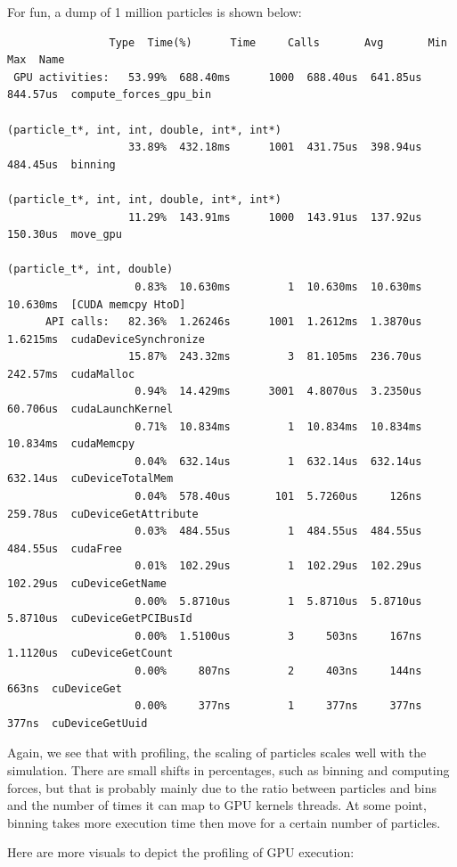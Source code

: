 \documentclass{article}
\begin{document}
For fun, a dump of 1 million particles is shown below:

\begin{verbatim}
                Type  Time(%)      Time     Calls       Avg       Min       Max  Name
 GPU activities:   53.99%  688.40ms      1000  688.40us  641.85us  844.57us  compute_forces_gpu_bin
                                                            (particle_t*, int, int, double, int*, int*)
                   33.89%  432.18ms      1001  431.75us  398.94us  484.45us  binning
                                                            (particle_t*, int, int, double, int*, int*)
                   11.29%  143.91ms      1000  143.91us  137.92us  150.30us  move_gpu
                                                            (particle_t*, int, double)
                    0.83%  10.630ms         1  10.630ms  10.630ms  10.630ms  [CUDA memcpy HtoD]
      API calls:   82.36%  1.26246s      1001  1.2612ms  1.3870us  1.6215ms  cudaDeviceSynchronize
                   15.87%  243.32ms         3  81.105ms  236.70us  242.57ms  cudaMalloc
                    0.94%  14.429ms      3001  4.8070us  3.2350us  60.706us  cudaLaunchKernel
                    0.71%  10.834ms         1  10.834ms  10.834ms  10.834ms  cudaMemcpy
                    0.04%  632.14us         1  632.14us  632.14us  632.14us  cuDeviceTotalMem
                    0.04%  578.40us       101  5.7260us     126ns  259.78us  cuDeviceGetAttribute
                    0.03%  484.55us         1  484.55us  484.55us  484.55us  cudaFree
                    0.01%  102.29us         1  102.29us  102.29us  102.29us  cuDeviceGetName
                    0.00%  5.8710us         1  5.8710us  5.8710us  5.8710us  cuDeviceGetPCIBusId
                    0.00%  1.5100us         3     503ns     167ns  1.1120us  cuDeviceGetCount
                    0.00%     807ns         2     403ns     144ns     663ns  cuDeviceGet
                    0.00%     377ns         1     377ns     377ns     377ns  cuDeviceGetUuid
\end{verbatim}

Again, we see that with profiling, the scaling of particles scales well with the simulation. There are small shifts in percentages, such as binning and computing forces, but that is probably mainly due to the ratio between particles and bins and the number of times it can map to GPU kernels threads. At some point, binning takes more execution time then move for a certain number of particles. 

Here are more visuals to depict the profiling of GPU execution: \\
\end{document}
